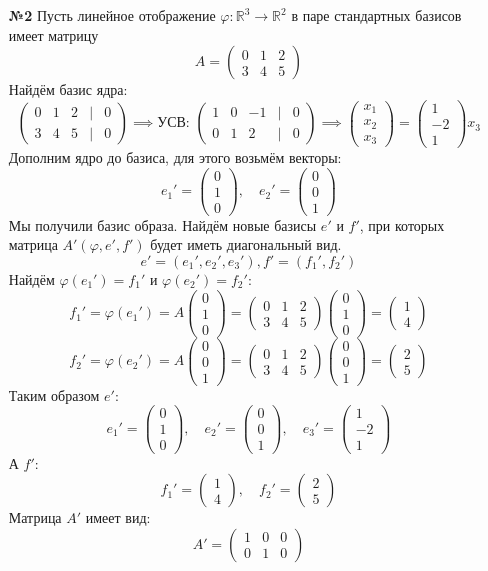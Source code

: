 \documentclass[a4paper]{article}
\newcommand{\mat}[1]{\begin{pmatrix} #1 \end{pmatrix}}
\renewcommand{\phi}{\varphi}
\begin{document}
\begin{enumerate}
    \item[\textbf{№2}]Пусть линейное отображение \( \varphi : \mathbb{R}^3 \to \mathbb{R}^2 \) в паре стандартных базисов имеет матрицу  
    \[A = \begin{pmatrix}
    0 & 1 & 2 \\
    3 & 4 & 5
    \end{pmatrix}\]  
    Найдём базис ядра:
    $$\begin{pmatrix}
        0 & 1 & 2 &|& 0\\
        3 & 4 & 5 &|& 0
    \end{pmatrix} \implies \text{УСВ: } \mat{1 & 0 & -1 &|& 0 \\
    0 & 1 & 2 &|& 0} \implies \mat{x_1\\x_2\\x_3} = \mat{1\\-2\\1}x_3$$
    Дополним ядро до базиса, для этого возьмём векторы:
    $$e_1' = \mat{0\\1\\0}, \quad e_2' = \mat{0\\0\\1}$$
    Мы получили базис образа. Найдём новые базисы $e'$ и $f'$, при которых матрица $A'(\phi, e', f')$ будет иметь диагональный вид. 
    $$e' = (e_1', e_2', e_3'), f' = (f_1', f_2')$$
    Найдём $\phi(e_1')=f_1'$ и $\phi(e_2')=f_2'$:
    $$f_1' = \phi(e_1') = A \mat{0\\1\\0} = \begin{pmatrix}
        0 & 1 & 2 \\
        3 & 4 & 5
        \end{pmatrix} \mat{0\\1\\0} = \mat{1\\4}$$
    $$f_2' = \phi(e_2') = A \mat{0\\0\\1} = \begin{pmatrix}
        0 & 1 & 2 \\
        3 & 4 & 5
        \end{pmatrix}\mat{0\\0\\1} = \mat{2\\5}$$
    Таким образом $e'$:
    $$e_1' = \mat{0\\1\\0}, \quad e_2' = \mat{0\\0\\1}, \quad e_3' = \mat{1\\-2\\1}$$
    А $f'$:
    $$f_1' =  \mat{1\\4}, \quad f_2' = \mat{2\\5}$$
    Матрица $A'$ имеет вид:
    $$A' = \mat{1&0&0\\0&1&0}$$\\


\end{enumerate}
\end{document}
